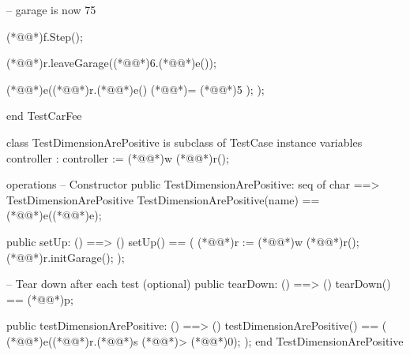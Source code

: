 \documentclass[a4paper]{article}
\begin{document}
\begin{vdm_al}
        -- garage is now 75%

        (*@@*)f.Step();

        (*@@*)r.leaveGarage((*@@*)6.(*@@*)e());
       
        (*@@*)e((*@@*)r.(*@@*)e() (*@\vdmnotcovered{}@*)= (*@@*)5 );
    );

end TestCarFee

class TestDimensionArePositive is subclass of TestCase
instance variables
    controller : controller := (*@@*)w (*@@*)r();

operations
    -- Constructor
    public TestDimensionArePositive: seq of char ==> TestDimensionArePositive
    TestDimensionArePositive(name) == (*@@*)e((*@@*)e);

    public setUp: () ==> ()
    setUp() == 
    (
        (*@@*)r := (*@@*)w (*@@*)r();
        (*@@*)r.initGarage();
    );

    -- Tear down after each test (optional)
    public tearDown: () ==> ()
    tearDown() == (*@@*)p;

    public testDimensionArePositive: () ==> ()
    testDimensionArePositive() ==
    (
        (*@@*)e((*@@*)r.(*@@*)s (*@\vdmnotcovered{}@*)> (*@\vdmnotcovered{}@*)0);
    );
end TestDimensionArePositive 
\end{vdm_al}
\bigskip
\end{document}
